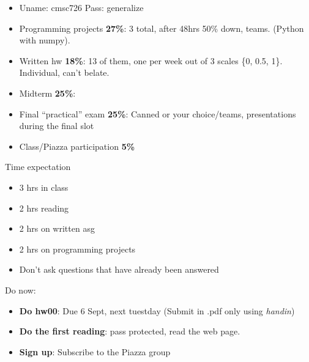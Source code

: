 \begin{itemize}
\item Uname: cmsc726 Pass: generalize
\item Programming projects \textbf{27\%}: 3 total, after 48hrs 50\%
  down, teams. (Python with numpy).
\item Written hw \textbf{18\%}: 13 of them, one per week out of 3
  scales \{0, 0.5, 1\}. Individual, can't belate.
\item Midterm \textbf{25\%}:
\item Final ``practical'' exam \textbf{25\%}: Canned or your
  choice/teams, presentations during the final slot
\item Class/Piazza participation \textbf{5\%}
\end{itemize}
Time expectation
\begin{itemize}
\item 3 hrs in class
\item 2 hrs reading
\item 2 hrs on written asg
\item 2 hrs on programming projects
\item Don't ask questions that have already been answered
\end{itemize}
Do now:
\begin{itemize}
\item \textbf{Do hw00}: Due 6 Sept, next tuestday (Submit in .pdf only using \emph{handin})
\item \textbf{Do the first reading}: pass protected, read the web page.
\item \textbf{Sign up}: Subscribe to the Piazza group
\end{itemize}

